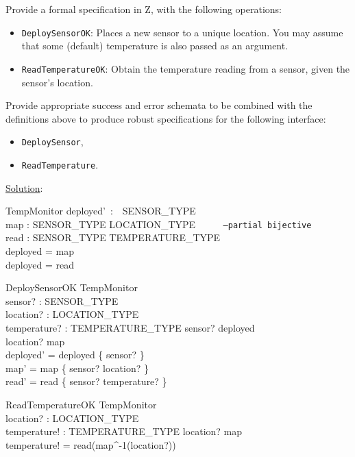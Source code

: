 \documentclass[12pt]{article}
\begin{document}
\noindent Provide a formal specification in Z, with the following operations:

\begin{itemize}
	\item \texttt{DeploySensorOK}:  Places a new sensor to a unique location. You may assume that some (default) temperature is also passed as an argument.
	\item \texttt{ReadTemperatureOK}: Obtain the temperature reading from a sensor, given the sensor's location.
\end{itemize}

\noindent Provide appropriate success and error schemata to be combined with the definitions above to produce robust specifications for the following interface:

\begin{itemize}
	\item \texttt{DeploySensor},
	\item \texttt{ReadTemperature}.
\end{itemize}

\newpage

\noindent \underline{Solution}:

\begin{schema}{TempMonitor}
deployed'~:~~SENSOR\_TYPE\\
map : SENSOR\_TYPE \nrightarrow LOCATION\_TYPE \texttt{~~~~~--partial bijective}\\
read : SENSOR\_TYPE  \nrightarrow TEMPERATURE\_TYPE\\
\where
deployed = \dom map\\
deployed = \dom read
\end{schema}

\begin{schema}{DeploySensorOK}
\Delta TempMonitor\\
sensor? : SENSOR\_TYPE\\
location? : LOCATION\_TYPE\\
temperature? : TEMPERATURE\_TYPE
\where
sensor? \notin deployed\\
location? \notin \ran map\\
deployed' = deployed \cup \{ sensor? \}\\
map' = map \cup \{ sensor? \mapsto location? \}\\
read' = read \cup \{ sensor? \mapsto temperature? \}
\end{schema}


\begin{schema}{ReadTemperatureOK}
\Xi TempMonitor\\
location? : LOCATION\_TYPE\\
temperature! : TEMPERATURE\_TYPE
\where
location? \in \ran map\\
temperature! = read(map^{-1}(location?))\\
\end{schema}
\end{document}
